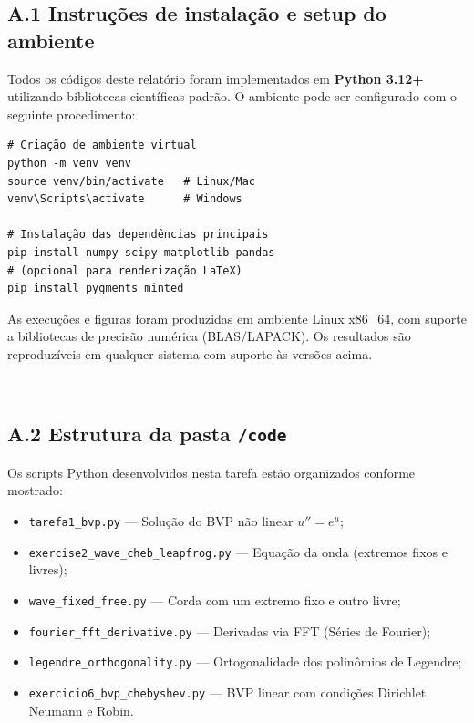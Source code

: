 \documentclass[12pt,a4paper]{article}
\begin{document}
\subsection{A.1 Instruções de instalação e setup do ambiente}

Todos os códigos deste relatório foram implementados em \textbf{Python 3.12+} utilizando bibliotecas científicas padrão.  
O ambiente pode ser configurado com o seguinte procedimento:

\begin{verbatim}
# Criação de ambiente virtual
python -m venv venv
source venv/bin/activate   # Linux/Mac
venv\Scripts\activate      # Windows

# Instalação das dependências principais
pip install numpy scipy matplotlib pandas
# (opcional para renderização LaTeX)
pip install pygments minted
\end{verbatim}

As execuções e figuras foram produzidas em ambiente Linux x86\_64, com suporte a bibliotecas de precisão numérica (BLAS/LAPACK).  
Os resultados são reproduzíveis em qualquer sistema com suporte às versões acima.

---

\subsection{A.2 Estrutura da pasta \texttt{/code}}

Os scripts Python desenvolvidos nesta tarefa estão organizados conforme mostrado:

\begin{itemize}
    \item \texttt{tarefa1\_bvp.py} — Solução do BVP não linear \(u'' = e^u\);
    \item \texttt{exercise2\_wave\_cheb\_leapfrog.py} — Equação da onda (extremos fixos e livres);
    \item \texttt{wave\_fixed\_free.py} — Corda com um extremo fixo e outro livre;
    \item \texttt{fourier\_fft\_derivative.py} — Derivadas via FFT (Séries de Fourier);
    \item \texttt{legendre\_orthogonality.py} — Ortogonalidade dos polinômios de Legendre;
    \item \texttt{exercicio6\_bvp\_chebyshev.py} — BVP linear com condições Dirichlet, Neumann e Robin.
\end{itemize}
\end{document}

